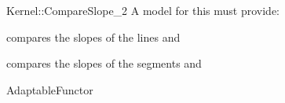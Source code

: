 \begin{ccRefFunctionObjectConcept}{Kernel::CompareSlope_2}
A model for this must provide:


      {compares the slopes of the lines  and }

      {compares the slopes of the segments  and }

\ccRefines
AdaptableFunctor

\ccSeeAlso

 \\

\end{ccRefFunctionObjectConcept}
